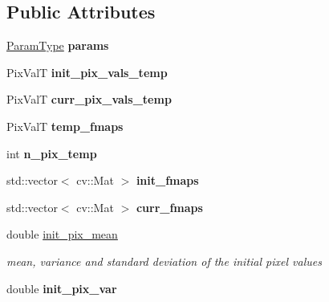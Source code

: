 \subsection*{Public Attributes}
\begin{DoxyCompactItemize}
\item 
\hypertarget{classFMaps_ae1978e3808fcbc57ff4f50b80f7212a7}{\hyperlink{structFMapsParams}{Param\-Type} {\bfseries params}}\label{classFMaps_ae1978e3808fcbc57ff4f50b80f7212a7}

\item 
\hypertarget{classFMaps_a578407854d4b3eaeda8ee9ded324ca42}{Pix\-Val\-T {\bfseries init\-\_\-pix\-\_\-vals\-\_\-temp}}\label{classFMaps_a578407854d4b3eaeda8ee9ded324ca42}

\item 
\hypertarget{classFMaps_ad5dc00a5301ce072cae9988421fafc6c}{Pix\-Val\-T {\bfseries curr\-\_\-pix\-\_\-vals\-\_\-temp}}\label{classFMaps_ad5dc00a5301ce072cae9988421fafc6c}

\item 
\hypertarget{classFMaps_afe142767b6fa9cdf85f6fe4b3c879156}{Pix\-Val\-T {\bfseries temp\-\_\-fmaps}}\label{classFMaps_afe142767b6fa9cdf85f6fe4b3c879156}

\item 
\hypertarget{classFMaps_afe63a5bc25ac16f19bc3eaf376b0c043}{int {\bfseries n\-\_\-pix\-\_\-temp}}\label{classFMaps_afe63a5bc25ac16f19bc3eaf376b0c043}

\item 
\hypertarget{classFMaps_ac318d7b585ade6c1f3b2e508b744f752}{std\-::vector$<$ cv\-::\-Mat $>$ {\bfseries init\-\_\-fmaps}}\label{classFMaps_ac318d7b585ade6c1f3b2e508b744f752}

\item 
\hypertarget{classFMaps_adb736ba3698e5dcc55be8445b93f45c9}{std\-::vector$<$ cv\-::\-Mat $>$ {\bfseries curr\-\_\-fmaps}}\label{classFMaps_adb736ba3698e5dcc55be8445b93f45c9}

\item 
\hypertarget{classFMaps_a831136868b56c4c2ebb001d8eacfd2b5}{double \hyperlink{classFMaps_a831136868b56c4c2ebb001d8eacfd2b5}{init\-\_\-pix\-\_\-mean}}\label{classFMaps_a831136868b56c4c2ebb001d8eacfd2b5}

\begin{DoxyCompactList}\small\item\em mean, variance and standard deviation of the initial pixel values \end{DoxyCompactList}\item 
\hypertarget{classFMaps_ad424b30cdb035c4359b03963f53b419a}{double {\bfseries init\-\_\-pix\-\_\-var}}\label{classFMaps_ad424b30cdb035c4359b03963f53b419a}


\end{DoxyCompactItemize}

